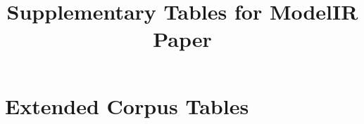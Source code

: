 \documentclass[conference]{IEEEtran}
\begin{document}
\title{Supplementary Tables for ModelIR Paper}
\maketitle

\section{Extended Corpus Tables}

\end{document}
